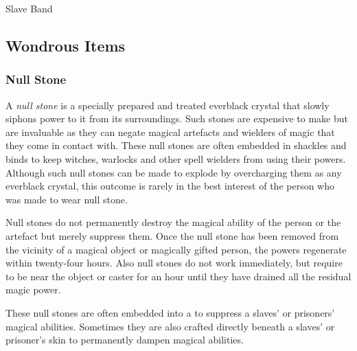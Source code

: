 \begin{35e}{Slave Band}
\end{35e}

\subsection{Wondrous Items}
\label{sec:Wondrous Items}

\subsubsection{Null Stone}
\label{sec:Null Stone}

A \emph{null stone} is a specially prepared and treated everblack crystal that
slowly siphons power to it from its surroundings. Such stones are expensive to
make but are invaluable as they can negate magical artefacts and wielders of
magic that they come in contact with. These null stones are often embedded in
shackles and binds to keep witches, warlocks and other spell wielders from
using their powers. Although such null stones can be made to explode by
overcharging them as any everblack crystal, this outcome is rarely in the best
interest of the person who was made to wear null stone.

Null stones do not permanently destroy the magical ability of the person or
the artefact but merely suppress them. Once the null stone has been removed
from the vicinity of a magical object or magically gifted person, the powers
regenerate within twenty-four hours. Also null stones do not work immediately,
but require to be near the object or caster for an hour until they have
drained all the residual magic power.

These null stones are often embedded into a  to
suppress a slaves' or prisoners' magical abilities. Sometimes they are also
crafted directly beneath a slaves' or prisoner's skin to permanently dampen
magical abilities.

